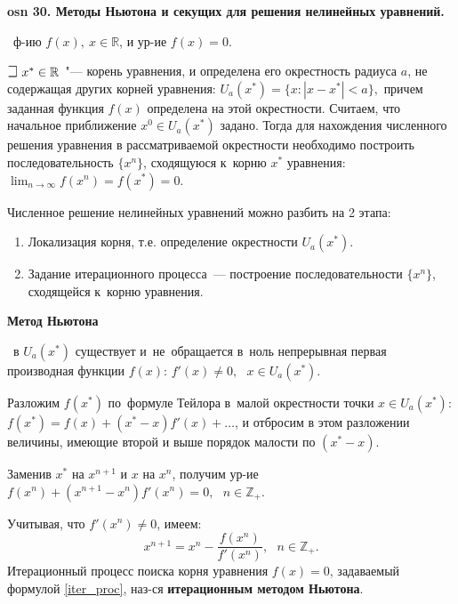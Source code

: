 \textbf{\LARGE osn 30. Методы Ньютона и секущих для решения нелинейных уравнений.}



\faEye \ ф-ию $f(x), ~x\in \mathbb{R}$, и ур-ие $f(x)=0.$

$\mathLet ~ x^* \in \mathbb{R}$~"--- корень уравнения, и определена его
окрестность радиуса $a$, не содержащая других корней уравнения: 
$U_a(x^*)=\{x:|x-x^*| < a\},$
причем заданная функция $f(x)$ определена на этой окрестности.
Считаем, что начальное приближение $x^0 \in U_a(x^*)$ задано.
Тогда для нахождения численного решения уравнения в
рассматриваемой окрестности необходимо построить последовательность
$\{x^n\}$, сходящуюся к~корню $x^*$ уравнения:
$\lim_{n\rightarrow\infty}f(x^n) = f(x^*) = 0.$
    
Численное решение нелинейных уравнений можно разбить на 2 этапа:
\begin{enumerate}
    \item Локализация корня, т.е. определение окрестности $U_a(x^*)$.
    \item Задание итерационного процесса~— построение последовательности
    $\{x^n\}$, сходящейся к~корню уравнения.
\end{enumerate}

\centerline{\textbf{Метод Ньютона}}

\mathLet \ в $U_a(x^*)$ существует и~не~обращается в~ноль непрерывная
первая производная функции $f(x)$: $f'(x) \neq 0,~~~x\in U_a(x^*).$

Разложим $f(x^*)$ по~формуле Тейлора в~малой окрестности точки $x\in U_a(x^*)$:
$f(x^*) =  f(x) + (x^* - x)f'(x) + \dots$, 
и отбросим в этом разложении величины, имеющие второй и выше порядок малости
по $(x^* - x)$.

Заменив $x^*$ на $x^{n+1}$ и $x$ на $x^n$, получим ур-ие 
$ f(x^n) + (x^{n + 1} - x^n)f'(x^n) = 0,~~~n\in \mathbb{Z}_+.$

Учитывая, что $f'(x^n) \neq 0$, имеем:
%
    \begin{equation}
        \label{iter_proc}
        x^{n + 1} = x^n - \frac{f(x^n)}{f'(x^n)},~~~n \in \mathbb{Z}_+.
    \end{equation}
%
Итерационный процесс поиска корня уравнения $f(x)=0$, задаваемый формулой \eqref{iter_proc},
наз-ся \textbf{итерационным методом Ньютона}.

